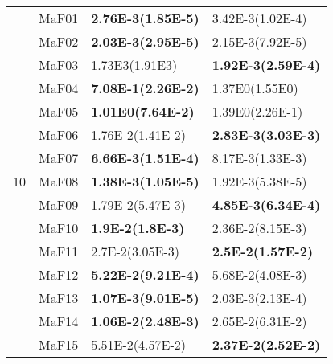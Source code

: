 \documentclass[]{article}
\begin{document}
\begin{table}
\begin{footnotesize}
\begin{tabular}{|l|l|l|l|}
\multirow{15}{*}{10} & MaF01 & \cellcolor{gray95} {\bf 2.76E-3(1.85E-5)} & 3.42E-3(1.02E-4)\\
 & MaF02 & \cellcolor{gray95} {\bf 2.03E-3(2.95E-5)} & 2.15E-3(7.92E-5)\\
 & MaF03 & 1.73E3(1.91E3) & \cellcolor{gray95} {\bf 1.92E-3(2.59E-4)}\\
 & MaF04 & \cellcolor{gray95} {\bf 7.08E-1(2.26E-2)} & 1.37E0(1.55E0)\\
 & MaF05 & \cellcolor{gray95} {\bf 1.01E0(7.64E-2)} & 1.39E0(2.26E-1)\\
 & MaF06 & 1.76E-2(1.41E-2) & \cellcolor{gray95} {\bf 2.83E-3(3.03E-3)}\\
 & MaF07 & \cellcolor{gray95} {\bf 6.66E-3(1.51E-4)} & 8.17E-3(1.33E-3)\\
 & MaF08 & \cellcolor{gray95} {\bf 1.38E-3(1.05E-5)} & 1.92E-3(5.38E-5)\\
 & MaF09 & 1.79E-2(5.47E-3) & \cellcolor{gray95} {\bf 4.85E-3(6.34E-4)}\\
 & MaF10 & \cellcolor{gray95} {\bf 1.9E-2(1.8E-3)} & \cellcolor{gray95} 2.36E-2(8.15E-3)\\
 & MaF11 & 2.7E-2(3.05E-3) & \cellcolor{gray95} {\bf 2.5E-2(1.57E-2)}\\
 & MaF12 & \cellcolor{gray95} {\bf 5.22E-2(9.21E-4)} & 5.68E-2(4.08E-3)\\
 & MaF13 & \cellcolor{gray95} {\bf 1.07E-3(9.01E-5)} & 2.03E-3(2.13E-4)\\
 & MaF14 & \cellcolor{gray95} {\bf 1.06E-2(2.48E-3)} & \cellcolor{gray95} 2.65E-2(6.31E-2)\\
 & MaF15 & 5.51E-2(4.57E-2) & \cellcolor{gray95} {\bf 2.37E-2(2.52E-2)}\\
\hline


\end{tabular}
\end{footnotesize}
\end{table}
\end{document}
